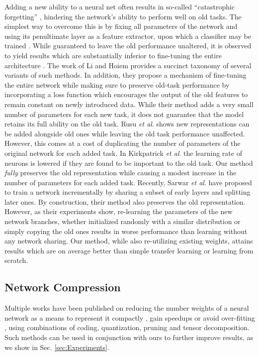 \documentclass[10pt,journal,compsoc]{IEEEtran}
\newcommand{\etal}{\textit{et al}.}
\begin{document}
Adding a new ability to a neural net often results in so-called ``catastrophic
forgetting'' \cite{french1999catastrophic}, hindering the network's
ability to perform well on old tasks. The simplest way to overcome
this is by fixing all parameters of the network and using its penultimate
layer as a feature extractor, upon which a classifier may be trained
\cite{donahue2014decaf,sharif2014cnn}. While guaranteed to leave
the old performance unaltered, it is observed to yield results which
are substantially inferior to fine-tuning the entire architecture
\cite{girshick2014rich}. The work of Li and Hoiem \cite{journals/corr/LiH16e}
provides a succinct taxonomy of several variants of such methods.
In addition, they propose a mechanism of fine-tuning the entire network
while making sure to preserve old-task performance by incorporating
a loss function which encourages the output of the old features to
remain constant on newly introduced data. While their method adds
a very small number of parameters for each new task, it does not guarantee
that the model retains its full ability on the old task. Rusu \etal
\cite{rusu2016progressive} shows new representations can be added
alongside old ones while leaving the old task performance unaffected.
However, this comes at a cost of duplicating the number of parameters
of the original network for each added task. In Kirkpatrick \etal
\cite{kirkpatrick2017overcoming} the learning rate of neurons is
lowered if they are found to be important to the old task. Our method
\emph{fully} preserves the old representation while causing a modest
increase in the number of parameters for each added task. Recently,
Sarwar \etal \cite{1712.02719} have proposed to train a network
incrementally by sharing a subset of early layers and splitting later
ones. By construction, their method also preserves the old representation.
However, as their experiments show, re-learning the parameters of
the new network branches, whether initialized randomly with a similar
distribution or simply copying the old ones results in worse performance
than learning without any network sharing. Our method, while also
re-utilizing existing weights, attains results which are on average
better than simple transfer learning or learning from scratch. 

\subsection{Network Compression}

Multiple works have been published on reducing the number weights
of a neural network as a means to represent it compactly \cite{han2015deep,han2015learning},
gain speedups \cite{denton2014exploiting} or avoid over-fitting \cite{hanson1988comparing},
using combinations of coding, quantization, pruning and tensor decomposition.
Such methods can be used in conjunction with ours to further improve
results, as we show in Sec. \ref{sec:Experiments}.
\end{document}
